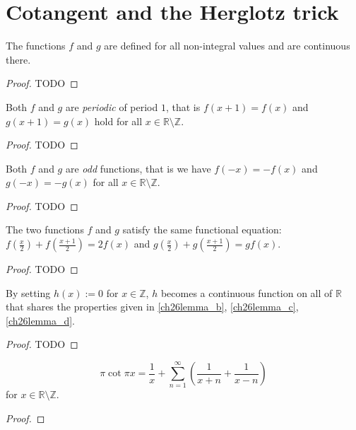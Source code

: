 \chapter{Cotangent and the Herglotz trick}

\begin{lemma}[A]
  \label{ch26lemma_a}
  The functions $f$ and $g$ are defined for all non-integral values and are continuous there.
\end{lemma}
\begin{proof}
  TODO
\end{proof}

\begin{lemma}[B]
  \label{ch26lemma_b}
  Both $f$ and $g$ are \emph{periodic} of period $1$, that is $f(x + 1) = f(x)$ and
  $g(x + 1) = g(x)$ hold for all $x\in \mathbb{R}\setminus\mathbb{Z}$.
\end{lemma}
\begin{proof}
  TODO
\end{proof}

\begin{lemma}[C]
  \label{ch26lemma_c}
  Both $f$ and $g$ are \emph{odd} functions, that is we have $f(-x) = -f(x)$ and
  $g(-x) = -g(x)$ for all $x\in \mathbb{R}\setminus\mathbb{Z}$.
\end{lemma}
\begin{proof}
  TODO
\end{proof}


\begin{lemma}[D]
  \label{ch26lemma_d}
  The two functions $f$ and $g$ satisfy the same functional equation:
  $f(\frac{x}{2}) + f(\frac{x + 1}{2}) = 2f(x)$ and
  $g(\frac{x}{2}) + g(\frac{x + 1}{2}) = gf(x)$.
\end{lemma}
\begin{proof}
  TODO
\end{proof}

\begin{lemma}[E]
  \label{ch26lemma_e}
  By setting $h(x) := 0$ for $x \in \mathbb{Z}$, $h$ becomes a continuous function
  on all of $\mathbb{R}$ that shares the properties given in
  \ref{ch26lemma_b}, \ref{ch26lemma_c}, \ref{ch26lemma_d}.
\end{lemma}
\begin{proof}
  TODO
\end{proof}

\begin{theorem}
  \label{ch26}
  \[
  \pi\cot{\pi x} = \frac{1}{x} + \sum_{n = 1}^\infty \left(\frac{1}{x + n} + \frac{1}{x - n}\right)
  \]
  for $x\in \mathbb{R}\setminus\mathbb{Z}$.
\end{theorem}
\begin{proof}
\end{proof}
